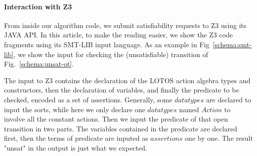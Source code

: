 \documentclass{lncs/llncs}
\newcommand{\TODO}[1]{\textcolor{red}{\textbf{[TODO:#1]}}}
\begin{document}

\paragraph{Interaction with Z3}
From inside our algorithm code, we submit satisfiability requests to
Z3 using its JAVA API. In this article, to make the reading easier, we
show the Z3 code fragments using its SMT-LIB input language. As an
example in
Fig~\ref{schema:smt-lib}, we show the input for checking the (unsatisfiable)
transition of Fig.~\ref{schema:unsat-ot}.

The input to Z3 contains the declaration of the LOTOS action algebra types
and constructors, then the declaration of variables, and finally the
predicate to be checked, encoded as a set of assertions.
Generally, some $datatypes$ are declared to input the sorts, while here
we only declare one $datatypes$ named $Action$ to involve all the
constant actions. Then we input the predicate of that open transition
in two parts. The variables contained in the predicate are declared
first, then the terms of predicate are inputed as $assertions$ one by
one. The result "unsat" in the output is just what we expected.   


%
\end{document}
